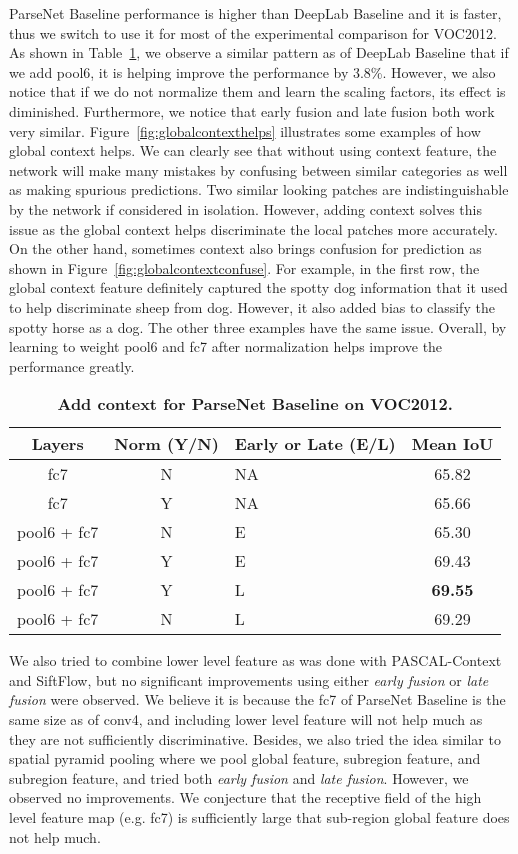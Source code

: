 \documentclass{article} \usepackage{iclr2016_conference}
\begin{document}
ParseNet Baseline performance is higher than DeepLab Baseline and it is faster, thus we switch to use it for most of the experimental comparison for VOC2012. As shown in Table~\ref{tab:voc2012fov}, we observe a similar pattern as of DeepLab Baseline that if we add pool6, it is helping improve the performance by 3.8\%. However, we also notice that if we do not normalize them and learn the scaling factors, its effect is diminished. Furthermore, we notice that early fusion and late fusion both work very similar. Figure~\ref{fig:globalcontexthelps} illustrates some examples of how global context helps. We can clearly see that without using context feature, the network will make many mistakes by confusing between similar categories as well as making spurious predictions. Two similar looking patches are indistinguishable by the network if considered in isolation. However, adding context solves this issue as the global context helps discriminate the local patches more accurately. On the other hand, sometimes context also brings confusion for prediction as shown in Figure~\ref{fig:globalcontextconfuse}. For example, in the first row, the global context feature definitely captured the spotty dog information that it used to help discriminate sheep from dog. However, it also added bias to classify the spotty horse as a dog. The other three examples have the same issue. Overall, by learning to weight pool6 and fc7 after  normalization helps improve the performance greatly.
\begin{table}[!htb]
	\centering
	\begin{tabular}{c|c|m{4em}|c}
		Layers & Norm (Y/N) & Early or Late (E/L) & Mean IoU\\
		\hline\hline
		fc7 & N & NA & 65.82\\
		fc7 & Y & NA & 65.66\\
		pool6 + fc7 & N & E & 65.30\\
		pool6 + fc7 & Y & E & 69.43\\
		pool6 + fc7 & Y & L & \textbf{69.55}\\
		pool6 + fc7 & N & L & 69.29\\
		\hline
	\end{tabular}
	\caption{\textbf{Add context for ParseNet Baseline on VOC2012.}}\label{tab:voc2012fov}
\end{table}
\vspace{-0.5em}

We also tried to combine lower level feature as was done with PASCAL-Context and SiftFlow, but no significant improvements using either \emph{early fusion} or \emph{late fusion} were observed. We believe it is because the fc7 of ParseNet Baseline is the same size as of conv4, and including lower level feature will not help much as they are not sufficiently discriminative. Besides, we also tried the idea similar to spatial pyramid pooling where we pool  global feature,  subregion feature, and  subregion feature, and tried both \emph{early fusion} and \emph{late fusion}. However, we observed no improvements. We conjecture that the receptive field of the high level feature map (e.g. fc7) is sufficiently large that sub-region global feature does not help much.
\end{document}
